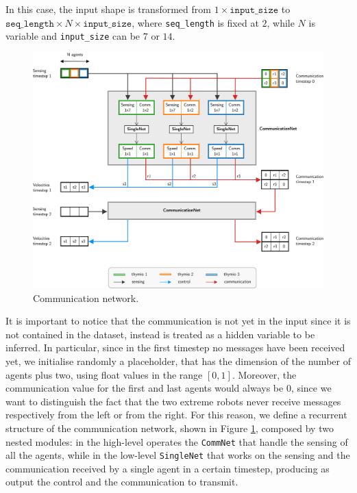In this case, the input shape is transformed from $1 \times \mathtt{input\_size}$ 
to $\mathtt{seq\_length} \times N \times \mathtt{input\_size}$, where 
\texttt{seq\_length} is fixed at $2$, while $N$ is variable and \texttt{input\_size} 
can be $7$ or $14$.

\begin{figure}[htb]
	\centering
	\includegraphics[width=\textwidth]{contents/images/commnet}
	\caption[Communication network.]{Communication network.}
	\label{fig:commnet1}
\end{figure}

It is important to notice that the communication is not yet in the input since it is 
not contained in the dataset, instead is treated as a hidden variable to be inferred. 
In particular, since in the first timestep no messages have been received yet, we 
initialise randomly a placeholder, that has the dimension of the number of agents 
plus two, using float values in the range $[0, 1]$. 
Moreover, the communication value for the first and last agents would always be 
$0$, since we want to distinguish the fact that the two extreme robots never 
receive messages respectively from the left or from the right.
For this reason, we define a recurrent structure of the communication network, 
shown in Figure \ref{fig:commnet1}, composed by two nested modules: in the 
high-level operates the \texttt{CommNet} that handle the sensing of all the 
agents, while in the low-level \texttt{SingleNet} that works on the sensing and the 
communication received by a single agent in a certain timestep, producing as 
output the control and the communication to transmit. 

